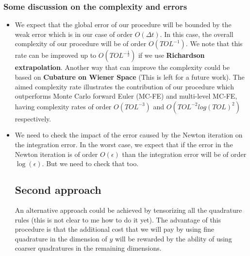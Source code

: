 \documentclass[11pt]{article}
\begin{document}
\subsubsection{Some discussion on the complexity and errors}
\begin{itemize}
	\item We expect that the global error of our procedure will be bounded by the weak error which is in our case of order $O(\Delta t)$. In this case, the overall complexity of our procedure will be of order $O(TOL^{-1})$. We note that this rate can be improved up to $O(TOL^{-\frac{1}{2}})$ if we use \textbf{Richardson extrapolation}. Another way that can improve the complexity could be based on \textbf{Cubature on Wiener Space} (This is left for a future work). The aimed complexity rate illustrates the contribution of our procedure which outperforms  Monte Carlo forward Euler (MC-FE) and multi-level MC-FE, having complexity rates of order $O(TOL^{-3})$  and $O(TOL^{-2} log(TOL)^2)$  respectively. 
	\item We need to check the impact of the error caused by the Newton iteration on the integration error. In the worst case, we expect that if the error in the Newton iteration is of order $O(\epsilon)$ than the integration error will be of order $\operatorname{log}(\epsilon)$. But we need to check that too.
\subsection{Second approach}
An alternative approach could be achieved by tensorizing all the quadrature rules (this is not clear to me how to do it yet). The advantage of this procedure is that the additional cost that we will pay by using fine quadrature in the dimension of $y$ will be rewarded by the ability of using coarser quadratures in the remaining dimensions.
\end{itemize}
\end{document}
